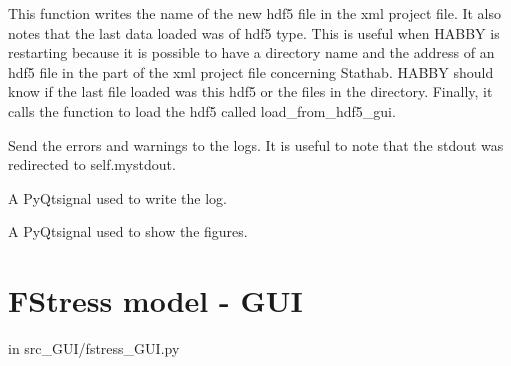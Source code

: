 \documentclass[letterpaper,10pt,english]{sphinxmanual}
\begin{document}
\begin{fulllineitems}
\begin{fulllineitems}
This function writes the name of the new hdf5 file in the xml project file. It also notes that the last data
loaded was of hdf5 type. This is useful when HABBY is restarting because it is possible to have a
directory name and the address of an hdf5 file in the part of the xml project file concerning Stathab.
HABBY should know if the last file loaded was this hdf5 or the files in the directory.
Finally, it calls the function to load the hdf5 called load\_from\_hdf5\_gui.

\end{fulllineitems}


\begin{fulllineitems}
\label{\detokenize{index:src_GUI.stathab_GUI.StathabW.send_err_log}}
Send the errors and warnings to the logs. It is useful to note that the stdout was redirected to self.mystdout.

\end{fulllineitems}


\begin{fulllineitems}
\label{\detokenize{index:src_GUI.stathab_GUI.StathabW.send_log}}
A PyQtsignal used to write the log.

\end{fulllineitems}


\begin{fulllineitems}
\label{\detokenize{index:src_GUI.stathab_GUI.StathabW.show_fig}}
A PyQtsignal used to show the figures.

\end{fulllineitems}


\end{fulllineitems}



\section{FStress model - GUI}
\label{\detokenize{index:fstress-model-gui}}
in src\_GUI/fstress\_GUI.py
\label{\detokenize{index:module-src_GUI.fstress_GUI}}
\end{document}
